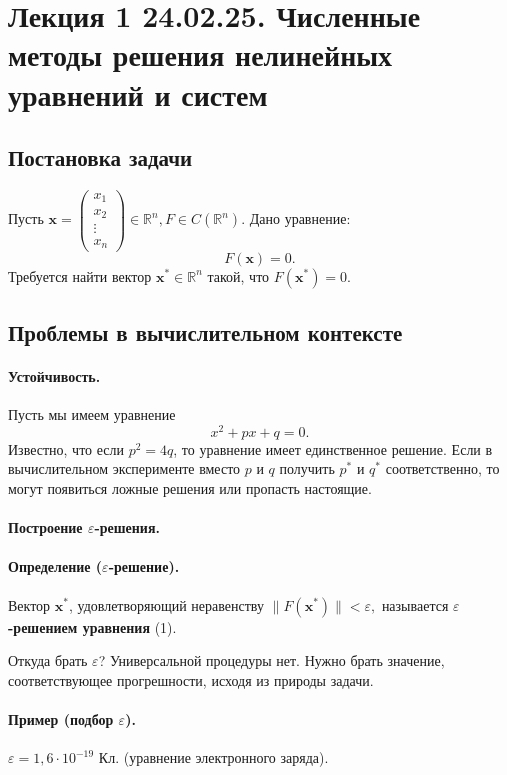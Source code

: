 \section{Лекция 1 24.02.25. Численные методы решения нелинейных уравнений и систем}
\subsection{Постановка задачи}
Пусть $\mathbf{x} = \begin{pmatrix} 
x_1    \\ 
x_2    \\ 
\vdots \\ 
x_n    
\end{pmatrix} \in \mathbb{R}^n, F \in C(\mathbb{R}^n).
$
Дано уравнение:
\begin{equation}
	F(\mathbf{x}) = 0. 
\end{equation}
Требуется найти вектор $\mathbf{x}^* \in \mathbb{R}^n$ такой, что $F(\mathbf{x}^*) = 0$.
\subsection{Проблемы в вычислительном контексте}
\paragraph{Устойчивость.}
Пусть мы имеем уравнение
\[
	x^2 + px + q = 0.
\]
Известно, что если $p^2 = 4q$,
то уравнение имеет единственное решение.
Если в вычислительном эксперименте вместо $p$ и $q$ получить $p^*$ и $q^*$ соответственно, то могут появиться ложные решения или пропасть настоящие.
\paragraph{Построение $\varepsilon$-решения.}
\paragraph{Определение ($\varepsilon$-решение).} Вектор $\mathbf{x}^*$, удовлетворяющий неравенству
$
\|F(\mathbf{x}^*)\| < \varepsilon,
$
называется \textbf{$\varepsilon$-решением уравнения} (1).

Откуда брать $\varepsilon$? Универсальной процедуры нет. Нужно брать значение, соответствующее прогрешности, исходя из природы задачи.
\paragraph{Пример (подбор $\varepsilon$).} 
$\varepsilon = 1,6 \cdot 10^{-19}$ Кл. (уравнение электронного заряда).
